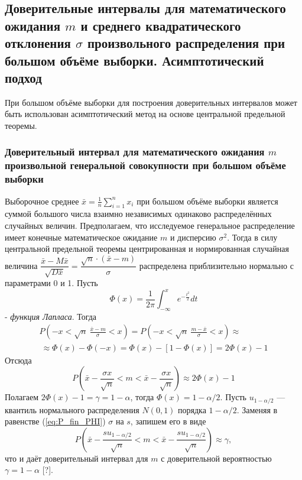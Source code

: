 \documentclass[main.tex]{subfiles}
\begin{document}
\subsection{Доверительные интервалы для математического ожидания $m$ и среднего квадратического отклонения $\sigma$ произвольного распределения при большом объёме выборки. Асимптотический подход}
При большом объёме выборки для построения доверительных интервалов может быть использован асимптотический метод на основе центральной предельной теоремы.

\subsubsection{Доверительный интервал для математического ожидания $m$ произвольной генеральной совокупности при большом объёме выборки}
Выборочное среднее $\bar{x} = \frac{1}{n}\sum_{i = 1}^{n}{x_{i}}$ при большом объёме выборки является суммой большого числа взаимно независимых одинаково распределённых случайных величин. Предполагаем, что исследуемое генеральное распределение имеет конечные математическое ожидание $m$ и дисперсию $\sigma^{2}$. Тогда в силу центральной предельной теоремы центрированная и нормированная случайная величина $\dfrac{\bar{x} - M\bar{x}}{\sqrt{D\bar{x}}} = \dfrac{\sqrt{n}·(\bar{x}-m)}{\sigma}$ распределена приблизительно нормально с параметрами 0 и 1. Пусть
\begin{equation}
	\Phi(x) = \frac{1}{2\pi}\int_{-\infty}^{x}{e^{-\frac{t^{2}}{2}}dt}
	\label{eq:f_lapl}
\end{equation}
- \textit{функция Лапласа}. Тогда
\begin{multline}
	P\left(-x < \sqrt{n} \ \frac{\bar{x} - m}{\sigma} < x \right) = 
	P\left(-x < \sqrt{n} \ \frac{m - \bar{x}}{\sigma} < x \right) \approx \\\
	\approx \Phi(x) - \Phi(-x)=\Phi(x) - [1 - \Phi(x)] = 2\Phi(x) - 1
	\label{eq:P_PHI}
\end{multline}
Отсюда
\begin{equation}
	P\left(\bar{x} - \frac{\sigma x}{\sqrt{n}} < m < \bar{x} - \frac{\sigma x}{\sqrt{n}} \right) \approx 2\Phi(x) - 1
	\label{eq:P_fin_PHI}
\end{equation}
Полагаем $2\Phi(x) - 1 = \gamma = 1 - \alpha$, тогда $\Phi(x) = 1 - \alpha/2$. Пусть $u_{1-\alpha/2}$ — квантиль нормального распределения $N(0,1)$ порядка $1-\alpha/2$. Заменяя в равенстве (\ref{eq:P_fin_PHI}) $\sigma$ на $s$, запишем его в виде
\begin{equation}
	P\left(\bar{x} - \frac{su_{1-\alpha/2}}{\sqrt{n}} < m < \bar{x} - \frac{su_{1-\alpha/2}}{\sqrt{n}} \right) \approx \gamma,
	\label{eq:P_fin_u}
\end{equation}
что и даёт доверительный интервал для $m$ с доверительной вероятностью $\gamma = 1-\alpha$ [?].
\end{document}
